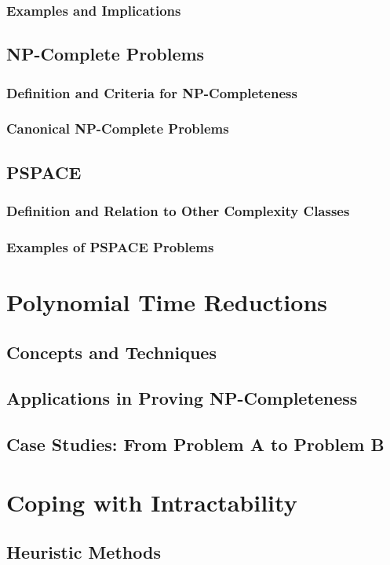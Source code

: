 \documentclass[12pt]{book} %
\begin{document}
\subsubsection{Examples and Implications}
\subsection{NP-Complete Problems}
\subsubsection{Definition and Criteria for NP-Completeness}
\subsubsection{Canonical NP-Complete Problems}
\subsection{PSPACE}
\subsubsection{Definition and Relation to Other Complexity Classes}
\subsubsection{Examples of PSPACE Problems}

\section{Polynomial Time Reductions}
\subsection{Concepts and Techniques}
\subsection{Applications in Proving NP-Completeness}
\subsection{Case Studies: From Problem A to Problem B}

\section{Coping with Intractability}
\subsection{Heuristic Methods}
\end{document}
